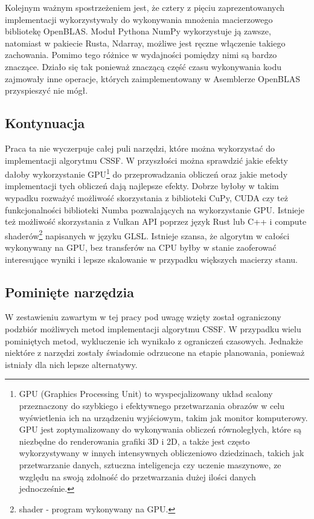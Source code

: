 \documentclass[11pt, a4paper]{article}
\begin{document}
\begin{sloppypar}
    Kolejnym ważnym spostrzeżeniem jest, że cztery z pięciu zaprezentowanych
    implementacji wykorzystywały do wykonywania mnożenia macierzowego bibliotekę
    OpenBLAS. Moduł Pythona NumPy wykorzystuje ją zawsze, natomiast w pakiecie Rusta, Ndarray,
    możliwe jest ręczne włączenie takiego zachowania. Pomimo tego różnice w wydajności pomiędzy
    nimi są bardzo znaczące. Działo się tak ponieważ znaczącą część czasu wykonywania
    kodu zajmowały inne operacje, których zaimplementowany w Asemblerze OpenBLAS przyspieszyć
    nie mógł.

    \subsection{Kontynuacja}
    Praca ta nie wyczerpuje całej puli narzędzi, które można wykorzystać do
    implementacji algorytmu CSSF. W przyszłości można sprawdzić jakie efekty dałoby wykorzystanie
    GPU\footnote{GPU (Graphics Processing Unit) to wyspecjalizowany układ scalony
    przeznaczony do szybkiego i efektywnego przetwarzania obrazów w celu wyświetlenia
    ich na urządzeniu wyjściowym, takim jak monitor komputerowy. GPU jest
    zoptymalizowany do wykonywania obliczeń równoległych, które są niezbędne do renderowania
    grafiki 3D i 2D, a także jest często wykorzystywany w innych intensywnych
    obliczeniowo dziedzinach, takich jak przetwarzanie danych, sztuczna inteligencja czy
    uczenie maszynowe, ze względu na swoją zdolność do przetwarzania dużej ilości danych
    jednocześnie.} do przeprowadzania obliczeń oraz jakie metody implementacji tych obliczeń
    dają najlepsze efekty. Dobrze byłoby w takim wypadku rozważyć możliwość skorzystania
    z biblioteki CuPy, CUDA czy też funkcjonalności biblioteki Numba pozwalających na wykorzystanie
    GPU. Istnieje też możliwość skorzystania z Vulkan API poprzez język Rust lub C++ i
    compute shaderów\footnote{shader - program wykonywany na GPU.} napisanych w języku GLSL.
    Istnieje szansa, że algorytm w całości wykonywany na GPU, bez transferów na CPU
    byłby w stanie zaoferować interesujące wyniki i lepsze skalowanie w przypadku
    większych macierzy stanu.

    \subsection{Pominięte narzędzia}
    W zestawieniu zawartym w tej pracy pod uwagę wzięty został ograniczony podzbiór
    możliwych metod implementacji algorytmu CSSF. W przypadku wielu pominiętych metod,
    wykluczenie ich wynikało z ograniczeń czasowych. Jednakże niektóre z narzędzi zostały
    świadomie odrzucone na etapie planowania, ponieważ istniały dla nich lepsze
    alternatywy.


\end{sloppypar}
\end{document}
